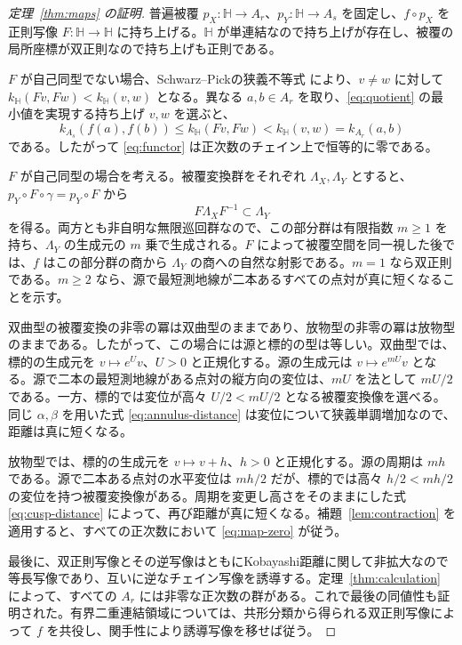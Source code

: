 \documentclass[12pt]{amsart}
\theoremstyle{definition}
\theoremstyle{remark}
\numberwithin{equation}{section}
\begin{document}
\begin{proof}[定理~\ref{thm:maps} の証明]
普遍被覆 $p_X:\mathbb H\to A_r$、$p_Y:\mathbb H\to A_s$ を固定し、$f\circ p_X$ を正則写像 $F:\mathbb H\to\mathbb H$ に持ち上げる。$\mathbb H$ が単連結なので持ち上げが存在し、被覆の局所座標が双正則なので持ち上げも正則である。

$F$ が自己同型でない場合、Schwarz--Pickの狭義不等式 \cite[Theorem 3.2]{BM} により、$v\ne w$ に対して $k_{\mathbb H}(Fv,Fw)<k_{\mathbb H}(v,w)$ となる。異なる $a,b\in A_r$ を取り、\eqref{eq:quotient} の最小値を実現する持ち上げ $v,w$ を選ぶと、
\[
 k_{A_s}(f(a),f(b))\le k_{\mathbb H}(Fv,Fw)
 <k_{\mathbb H}(v,w)=k_{A_r}(a,b)
\]
である。したがって \eqref{eq:functor} は正次数のチェイン上で恒等的に零である。

$F$ が自己同型の場合を考える。被覆変換群をそれぞれ $\Lambda_X,\Lambda_Y$ とすると、$p_Y\circ F\circ\gamma=p_Y\circ F$ から
\[
 F\Lambda_XF^{-1}\subset\Lambda_Y
\]
を得る。両方とも非自明な無限巡回群なので、この部分群は有限指数 $m\ge1$ を持ち、$\Lambda_Y$ の生成元の $m$ 乗で生成される。$F$ によって被覆空間を同一視した後では、$f$ はこの部分群の商から $\Lambda_Y$ の商への自然な射影である。$m=1$ なら双正則である。$m\ge2$ なら、源で最短測地線が二本あるすべての点対が真に短くなることを示す。

双曲型の被覆変換の非零の冪は双曲型のままであり、放物型の非零の冪は放物型のままである。したがって、この場合には源と標的の型は等しい。双曲型では、標的の生成元を $v\mapsto e^U v$、$U>0$ と正規化する。源の生成元は $v\mapsto e^{mU}v$ となる。源で二本の最短測地線がある点対の縦方向の変位は、$mU$ を法として $mU/2$ である。一方、標的では変位が高々 $U/2<mU/2$ となる被覆変換像を選べる。同じ $\alpha,\beta$ を用いた式 \eqref{eq:annulus-distance} は変位について狭義単調増加なので、距離は真に短くなる。

放物型では、標的の生成元を $v\mapsto v+h$、$h>0$ と正規化する。源の周期は $mh$ である。源で二本ある点対の水平変位は $mh/2$ だが、標的では高々 $h/2<mh/2$ の変位を持つ被覆変換像がある。周期を変更し高さをそのままにした式 \eqref{eq:cusp-distance} によって、再び距離が真に短くなる。補題~\ref{lem:contraction} を適用すると、すべての正次数において \eqref{eq:map-zero} が従う。

最後に、双正則写像とその逆写像はともにKobayashi距離に関して非拡大なので等長写像であり、互いに逆なチェイン写像を誘導する。定理~\ref{thm:calculation} によって、すべての $A_r$ には非零な正次数の群がある。これで最後の同値性も証明された。有界二重連結領域については、共形分類から得られる双正則写像によって $f$ を共役し、関手性により誘導写像を移せば従う。
\end{proof}
\end{document}
